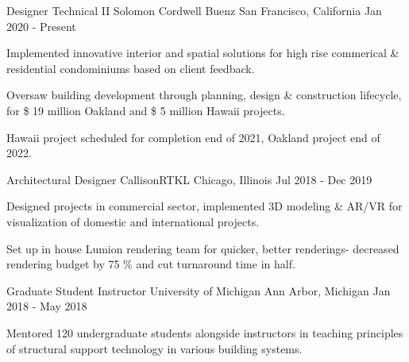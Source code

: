 \vspace{-2mm}

\begin{cventries}

  \cventry
    {Designer Technical II} %
    {Solomon Cordwell Buenz} %
    {San Francisco, California} %
    {Jan 2020 - Present} %
    {
      \begin{cvitems} %
        \item {Implemented innovative interior and spatial solutions for high rise commerical \& residential condominiums based on client feedback.}
        \item {Oversaw building development through planning, design \& construction lifecycle, for \$ 19 million Oakland and \$ 5 million Hawaii projects.} 
        \item {Hawaii project scheduled for completion end of 2021, Oakland project end of 2022.}        
      \end{cvitems}
    }

  \cventry
    {Architectural Designer} %
    {CallisonRTKL} %
    {Chicago, Illinois} %
    {Jul 2018 - Dec 2019} %
    {
      \begin{cvitems} %
        \item {Designed projects in commercial sector, implemented 3D modeling \& AR/VR for visualization of domestic and international projects.}
        \item {Set up in house Lumion rendering team for quicker, better renderings- decreased rendering budget by 75 \% and cut turnaround time in half.}
      \end{cvitems}
    }

  \cventry
	{Graduate Student Instructor} %
	{University of Michigan} %
	{Ann Arbor, Michigan} %
	{Jan 2018 - May 2018} %
	{
		\begin{cvitems} %
			\item {Mentored 120 undergraduate students alongside instructors in teaching principles of structural support technology in various building systems.}
		\end{cvitems}
	}

\vspace{-4mm}

\end{cventries}
